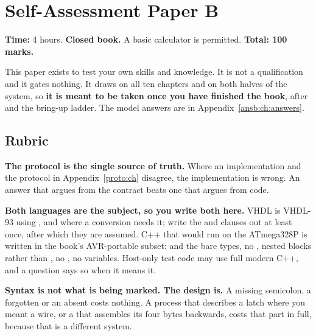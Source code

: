 
\chapter{Self-Assessment Paper B}
\label{exb:ch:paper}

\noindent\textbf{Time:} 4 hours. \textbf{Closed book.} A basic calculator is permitted.
\textbf{Total: 100 marks.}

\medskip
This paper exists to test your own skills and knowledge. It is not a qualification and it gates
nothing. It draws on all ten chapters and on both halves of the system, so \textbf{it is meant to be
taken once you have finished the book}, after  and the bring-up ladder. The model
answers are in Appendix~\ref{ansb:ch:answers}.

\section*{Rubric}
\textbf{The protocol is the single source of truth.} Where an implementation and the protocol in
Appendix~\ref{proto:ch} disagree, the implementation is wrong. An answer that argues from the
contract beats one that argues from code.

\textbf{Both languages are the subject, so you write both here.} VHDL is VHDL-93 using
, and  where a conversion needs it; write the
 and  clauses out at least once, after which they are assumed. C++ that would
run on the ATmega328P is written in the book's AVR-portable subset:  and the bare
types, no , nested  blocks rather than , no
\code{[[nodiscard]]}, no  variables. Host-only test code may use full modern C++, and a
question says so when it means it.

\textbf{Syntax is not what is being marked. The design is.} A missing semicolon, a forgotten
 or an absent  costs nothing. A process that describes a latch where you
meant a wire, or a  that assembles its four bytes backwards, costs that part in full,
because that is a different system.

